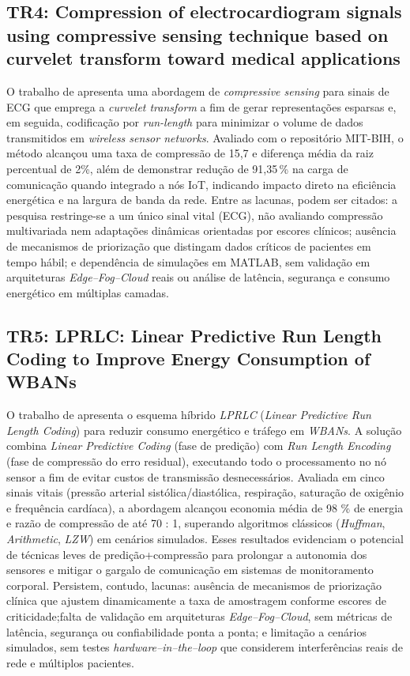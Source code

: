 \documentclass[twoside,english,brazilian]{UNISINOSmonografia}
\begin{document}
\subsection{TR4: Compression of electrocardiogram signals using compressive sensing technique based on curvelet transform toward medical applications \cite{Hassan2024}}
O trabalho de \cite{Hassan2024} apresenta uma abordagem de \textit{compressive sensing} para sinais de ECG que emprega a \textit{curvelet transform} a fim de gerar representações esparsas e, em seguida, codificação por \textit{run-length} para minimizar o volume de dados transmitidos em \textit{wireless sensor networks}. Avaliado com o repositório MIT-BIH, o método alcançou uma taxa de compressão de 15,7 e diferença média da raiz percentual de 2\%, além de demonstrar redução de 91{,}35\,\% na carga de comunicação quando integrado a nós IoT, indicando impacto direto na eficiência energética e na largura de banda da rede. Entre as lacunas, podem ser citados: a pesquisa restringe-se a um único sinal vital (ECG), não avaliando compressão multivariada nem adaptações dinâmicas orientadas por escores clínicos; ausência de mecanismos de priorização que distingam dados críticos de pacientes em tempo hábil; e dependência de simulações em MATLAB, sem validação em arquiteturas \textit{Edge–Fog–Cloud} reais ou análise de latência, segurança e consumo energético em múltiplas camadas.

\subsection{TR5: LPRLC: Linear Predictive Run Length Coding to Improve Energy Consumption of WBANs \cite{Vakil2024}}
O trabalho de \cite{Vakil2024} apresenta o esquema híbrido \textit{LPRLC} (\textit{Linear Predictive Run Length Coding}) para reduzir consumo energético e tráfego em \textit{WBANs}. A solução combina \textit{Linear Predictive Coding} (fase de predição) com \textit{Run Length Encoding} (fase de compressão do erro residual), executando todo o processamento no nó sensor a fim de evitar custos de transmissão desnecessários. Avaliada em cinco sinais vitais (pressão arterial sistólica/diastólica, respiração, saturação de oxigênio e frequência cardíaca), a abordagem alcançou economia média de 98 \% de energia e razão de compressão de até 70 : 1, superando algoritmos clássicos (\textit{Huffman}, \textit{Arithmetic}, \textit{LZW}) em cenários simulados. Esses resultados evidenciam o potencial de técnicas leves de predição+compressão para prolongar a autonomia dos sensores e mitigar o gargalo de comunicação em sistemas de monitoramento corporal. Persistem, contudo, lacunas: ausência de mecanismos de priorização clínica que ajustem dinamicamente a taxa de amostragem conforme escores de criticidade;falta de validação em arquiteturas \textit{Edge–Fog–Cloud}, sem métricas de latência, segurança ou confiabilidade ponta a ponta; e limitação a cenários simulados, sem testes \textit{hardware–in–the–loop} que considerem interferências reais de rede e múltiplos pacientes.
\end{document}
